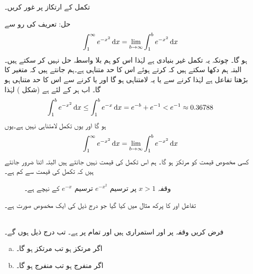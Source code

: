 تکمل  کے ارتکاز پر غور کریں۔

حل:\quad
تعریف کی رو سے
\begin{align*}
\int_1^{\infty}e^{-x^2}\dif x=\lim_{b\to \infty}\int_1^b e^{-x^2}\dif x
\end{align*}
ہو گا۔ چونکہ یہ تکمل غیر بنیادی ہے لہٰذا اس کو ہم بلا واسطہ حل نہیں کر سکتے ہیں۔ البتہ ہم دکھا سکتے ہیں کہ  کرتے ہوئے اس کا حد متناہی ہے۔ہم جانتے ہیں کہ  متغیر  کا بڑھتا تفاعل ہے لہٰذا  کرنے سے یا یہ لامتناہی ہو گا اور یا  کرنے سے اس کا حد متناہی ہو گا۔ اب ہر  کے لئے  ہے (شکل ) لہٰذا
\begin{align*}
\int_1^be^{-x^2}\dif x\le \int_1^be^{-x}\dif x=e^{-b}+e^{-1}<e^{-1}\approx 0.36788
\end{align*}
ہو گا اور یوں تکمل لامتناہی نہیں ہے۔یوں
\begin{align*}
\int_1^{\infty}e^{-x^2}\dif x=\lim_{b\to\infty}\int_1^be^{-x^2}\dif x
\end{align*}
کسی مخصوص قیمت کو مرتکز ہو گا۔ ہم اس تکمل کی قیمت نہیں جانتے ہیں البتہ اتنا ضرور جانتے ہیں کہ تکمل کی قیمت  سے کم ہے۔
\begin{figure}
\centering
{}
\caption{وقفہ $x>1$ پر ترسیم $e^{-x^2}$ ترسیم $e^{-x}$ کے نیچے ہے۔}
\label{شکل_مثال_طریقہ_ارتکاز_پرکھ}
\end{figure}

تفاعل  اور  کا پرکھ مثال   میں کیا گیا جو درج ذیل کی ایک مخصوص صورت ہے۔


\\
فرض کریں وقفہ \عددی{[a,\infty)} پر  اور  استمراری ہیں اور تمام  پر  ہے۔ تب درج ذیل ہوں  گے۔
\begin{enumerate}[a.]
\item
اگر  مرتکز ہو تب  مرتکز ہو گا۔
\item
اگر  منفرج ہو تب  منفرج ہو گا۔
\end{enumerate}

